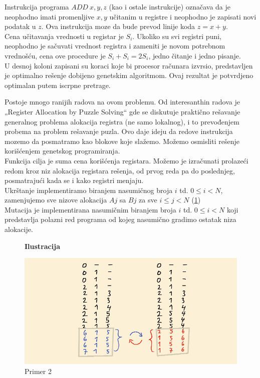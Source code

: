 \documentclass[a4paper, 12pt]{article}
\begin{document}
Instrukcija programa $ADD\ x, y, z$ (kao i ostale instrukcije) označava da je neophodno imati promenljive $x, y$ učitanim u registre i neophodno je zapisati novi podatak u $z$. Ova instrukcija moze da bude prevod linije koda $z=x+y$.\\
Cena učitavanja vrednosti u registar je $S_i$. Ukoliko su svi registri puni, neophodno je sačuvati vrednost registra i zameniti je novom potrebnom vrednošću, cena ove procedure je $S_i+S_i=2S_i$, jedno čitanje i jedno pisanje.\\
U desnoj koloni zapisani su koraci koje bi procesor računara izvrsio, predstavljen je optimalno rešenje dobijeno genetskim algoritmom. Ovaj rezultat je potvrdjeno optimalan putem iscrpne pretrage.

Postoje mnogo ranijih radova na ovom problemu. Od interesanthin radova je „Register Allocation by Puzzle Solving“ gde se diskutuje praktično rešavanje generalnog problema alokacija registra (ne samo lokalnog), i to prevođenjem probema na problem rešavanje puzla\cite{RegisterAllocationByPuzzleSolving}. Ovo daje ideju da redove instrukcija mozemo da posmatramo kao blokove koje slažemo. Možemo osmisliti rešenje korišćenjem genetskog programiranja.\\
Funkcija cilja je suma cena korišćenja registara. Možemo je izračunati prolazeći redom kroz niz alokacija registara rešenja, od prvog reda pa do poslednjeg, posmatrajući kada se i kako registri menjaju.\\
Ukrštanje implementiramo biranjem nasumičnog broja $i$ td. $0 \leq i < N$, zamenjujemo sve nizove alokacija $Aj$ sa $Bj$ za sve $i \leq j < N$ (\ref{primer2})\\
Mutacija je implementirana nasumičnim biranjem broja $i$ td. $0 \leq i < N$ koji predstavlja polazni red programa od kojeg nasumično gradimo ostatak niza alokacije.\\


\begin{figure}
\centering
\textbf{Ilustracija}\par\medskip
\includegraphics[scale=0.45]{Image/Illustration2}
\caption{Primer 2}
\label{primer2}
\end{figure}
\end{document}
